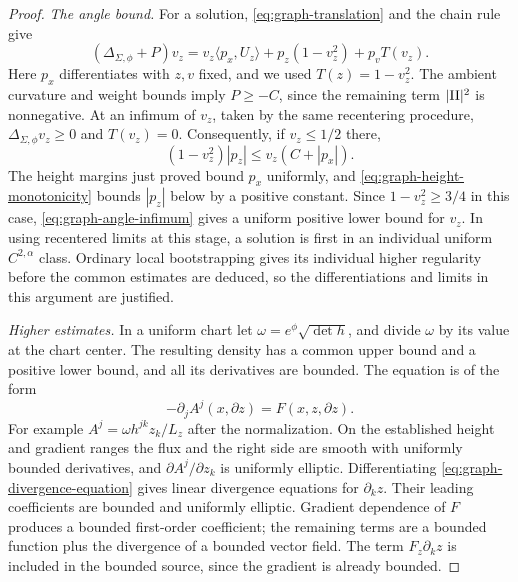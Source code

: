 \begin{proof}
\emph{The angle bound.}
For a solution, \eqref{eq:graph-translation} and the chain rule give
\begin{equation}
 (\Delta_{\Sigma,\phi}+P)v_z
   =v_z\langle p_x,U_z\rangle
       +p_z(1-v_z^2)+p_vT(v_z).
 \label{eq:graph-angle-equation}
\end{equation}
Here \(p_x\) differentiates with \(z,v\) fixed, and we used
\(T(z)=1-v_z^2\).  The ambient curvature and weight bounds imply
\(P\ge-C\), since the remaining term \(|\mathrm{II}|^2\) is nonnegative.
At an infimum of \(v_z\), taken by the same recentering procedure,
\(\Delta_{\Sigma,\phi}v_z\ge0\) and \(T(v_z)=0\).  Consequently, if
\(v_z\le1/2\) there,
\begin{equation}
 (1-v_z^2)|p_z|\le v_z(C+|p_x|).
 \label{eq:graph-angle-infimum}
\end{equation}
The height margins just proved bound \(p_x\) uniformly, and
\eqref{eq:graph-height-monotonicity} bounds \(|p_z|\) below by a
positive constant.  Since \(1-v_z^2\ge3/4\) in this case,
\eqref{eq:graph-angle-infimum} gives a uniform positive lower bound
for \(v_z\).  In using recentered limits at this stage, a solution
is first in an individual uniform \(C^{2,\alpha}\) class.  Ordinary
local bootstrapping gives its individual higher regularity before
the common estimates are deduced, so the differentiations and
limits in this argument are justified.

\emph{Higher estimates.}
In a uniform chart let
\(\omega=e^\phi\sqrt{\det h}\), and divide \(\omega\) by its value
at the chart center.  The resulting density has a common upper
bound and a positive lower bound, and all its derivatives are
bounded.  The equation is of the form
\begin{equation}
 -\partial_j A^j(x,\partial z)=F(x,z,\partial z).
 \label{eq:graph-divergence-equation}
\end{equation}
For example \(A^j=\omega h^{jk}z_k/L_z\) after the normalization.
On the established height and gradient ranges the flux and the
right side are smooth with uniformly bounded derivatives, and
\(\partial A^j/\partial z_k\) is uniformly elliptic.  Differentiating
\eqref{eq:graph-divergence-equation} gives linear divergence
equations for \(\partial_kz\).  Their leading coefficients are
bounded and uniformly elliptic.  Gradient dependence of \(F\)
produces a bounded first-order coefficient; the remaining terms
are a bounded function plus the divergence of a bounded vector
field.  The term \(F_z\partial_kz\) is included in the bounded
source, since the gradient is already bounded.


\end{proof}
